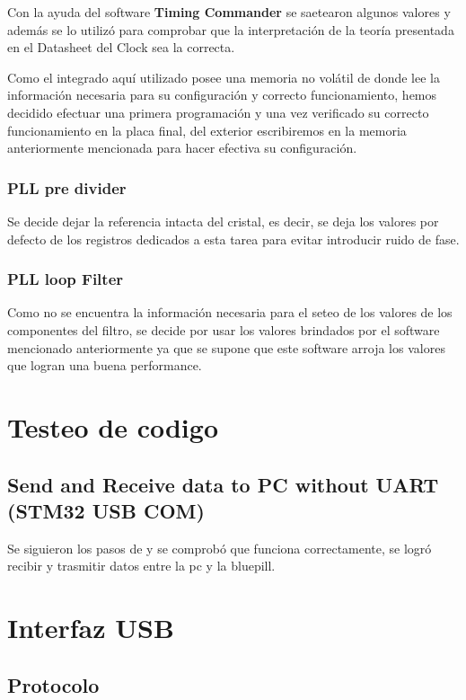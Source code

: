 \documentclass[a4paper,12pt]{report} %
\begin{document}
Con la ayuda del software \textbf{Timing Commander} se saetearon algunos valores y además se lo utilizó para comprobar que la interpretación de la teoría presentada en el Datasheet del Clock sea la correcta.

Como el integrado aquí utilizado posee una memoria no volátil de donde lee la información necesaria para su configuración y correcto funcionamiento, hemos decidido efectuar una primera programación y una vez verificado su correcto funcionamiento en la placa final, del exterior escribiremos en la memoria anteriormente mencionada para hacer efectiva su configuración.

\subsection{PLL pre divider}

Se decide dejar la referencia intacta del cristal, es decir, se deja los valores por defecto de los registros dedicados a esta tarea para evitar introducir ruido de fase.

\subsection{PLL loop Filter}

Como no se encuentra la información necesaria para el seteo de los valores de los componentes del filtro, se decide por usar los valores brindados por el software mencionado anteriormente ya que se supone que este software arroja los valores que logran una buena performance.


\chapter{Testeo de codigo}

\section{Send and Receive data to PC without UART (STM32 USB COM)}

Se siguieron los pasos de \cite{ct1} y se comprobó que funciona correctamente, se logró recibir y trasmitir datos entre la pc y la bluepill.

\chapter{Interfaz USB}

\section{Protocolo}
\end{document}
